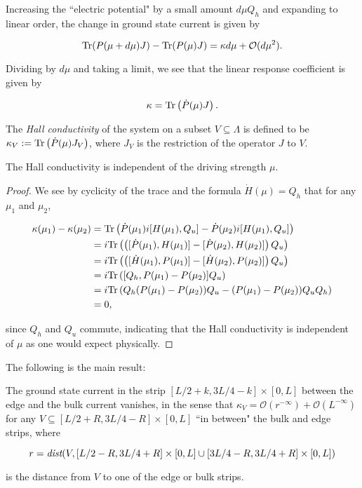 \documentclass[12pt, letterpaper]{article}
\begin{document}
Increasing the ``electric potential" by a small amount $d\mu Q_h$ and expanding to linear order, the change in ground state current is given by

\[\text{Tr}(P(\mu+d\mu)J) - \text{Tr}(P(\mu)J) = \kappa d\mu + \mathcal{O}(d\mu^2).\]

Dividing by $d\mu$ and taking a limit, we see that the linear response coefficient is given by

\[\kappa = \text{Tr}\left(\dot{P}(\mu) J\right).\]

The \emph{Hall conductivity} of the system on a subset $V \subseteq \Lambda$ is defined to be $\kappa_V := \text{Tr}\left(\dot{P}(\mu) J_V\right)$, where $J_V$ is the restriction of the operator $J$ to $V$. 

\begin{proposition}
The Hall conductivity is independent of the driving strength $\mu$.
\end{proposition}
\begin{proof}
We see by cyclicity of the trace and the formula $\dot{H}(\mu)=Q_h$ that for any $\mu_1$ and $\mu_2$,

\[\begin{aligned}
\kappa(\mu_1) - \kappa(\mu_2) &= \text{Tr}\left( \dot{P}(\mu_1) i[H(\mu_1), Q_u] - \dot{P}(\mu_2)i[H(\mu_1),Q_u]\right)\\
&= i\text{Tr}\left(\left([\dot{P}(\mu_1), H(\mu_1)] - [\dot{P}(\mu_2), H(\mu_2)]\right)Q_u\right)\\
&= i\text{Tr}\left( \left([\dot{H}(\mu_1), P(\mu_1)] - [\dot{H}(\mu_2), P(\mu_2)]\right)Q_u \right)\\
&= i\text{Tr}\left( [Q_h, P(\mu_1) - P(\mu_2)]Q_u \right)\\
&= i\text{Tr} \left( Q_h(P(\mu_1) - P(\mu_2))Q_u - (P(\mu_1)-P(\mu_2))Q_uQ_h \right)\\
&= 0,
\end{aligned}\]

since $Q_h$ and $Q_u$ commute, indicating that the Hall conductivity is independent of $\mu$ as one would expect physically.
\end{proof}

The following is the main result:

\begin{theorem}
The ground state current in the strip $[L/2+k, 3L/4-k] \times [0,L]$ between the edge and the bulk current vanishes, in the sense that $\kappa_V = \mathcal{O}(r^{-\infty}) + \mathcal{O}(L^{-\infty})$ for any $V \subseteq [L/2+R, 3L/4-R] \times [0,L]$ ``in between" the bulk and edge strips, where 

\[r = \emph{dist}(V, [L/2-R, 3L/4+R] \times [0, L] \cup [3L/4-R, 3L/4+R] \times [0, L])\]

is the distance from $V$ to one of the edge or bulk strips.

\end{theorem}
\end{document}
